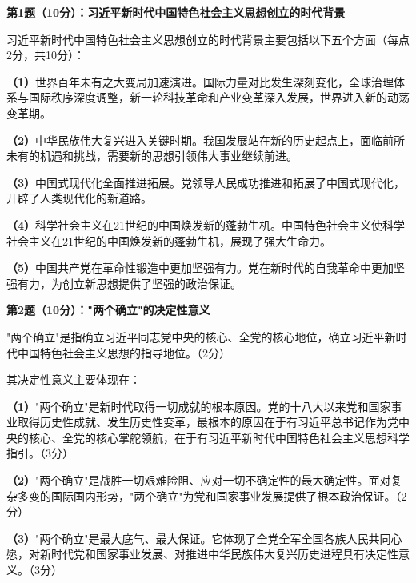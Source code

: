\documentclass[12pt, a4paper]{article}
\begin{document}
\begin{answerbox}

\textbf{第1题（10分）：习近平新时代中国特色社会主义思想创立的时代背景}

习近平新时代中国特色社会主义思想创立的时代背景主要包括以下五个方面（每点2分，共10分）：

\textbf{（1）}世界百年未有之大变局加速演进。国际力量对比发生深刻变化，全球治理体系与国际秩序深度调整，新一轮科技革命和产业变革深入发展，世界进入新的动荡变革期。

\textbf{（2）}中华民族伟大复兴进入关键时期。我国发展站在新的历史起点上，面临前所未有的机遇和挑战，需要新的思想引领伟大事业继续前进。

\textbf{（3）}中国式现代化全面推进拓展。党领导人民成功推进和拓展了中国式现代化，开辟了人类现代化的新道路。

\textbf{（4）}科学社会主义在21世纪的中国焕发新的蓬勃生机。中国特色社会主义使科学社会主义在21世纪的中国焕发新的蓬勃生机，展现了强大生命力。

\textbf{（5）}中国共产党在革命性锻造中更加坚强有力。党在新时代的自我革命中更加坚强有力，为创立新思想提供了坚强的政治保证。

\end{answerbox}

\begin{answerbox}

\textbf{第2题（10分）："两个确立"的决定性意义}

"两个确立"是指确立习近平同志党中央的核心、全党的核心地位，确立习近平新时代中国特色社会主义思想的指导地位。（2分）

其决定性意义主要体现在：

\textbf{（1）}"两个确立"是新时代取得一切成就的根本原因。党的十八大以来党和国家事业取得历史性成就、发生历史性变革，最根本的原因在于有习近平总书记作为党中央的核心、全党的核心掌舵领航，在于有习近平新时代中国特色社会主义思想科学指引。（3分）

\textbf{（2）}"两个确立"是战胜一切艰难险阻、应对一切不确定性的最大确定性。面对复杂多变的国际国内形势，"两个确立"为党和国家事业发展提供了根本政治保证。（2分）

\textbf{（3）}"两个确立"是最大底气、最大保证。它体现了全党全军全国各族人民共同心愿，对新时代党和国家事业发展、对推进中华民族伟大复兴历史进程具有决定性意义。（3分）

\end{answerbox}
\end{document}
